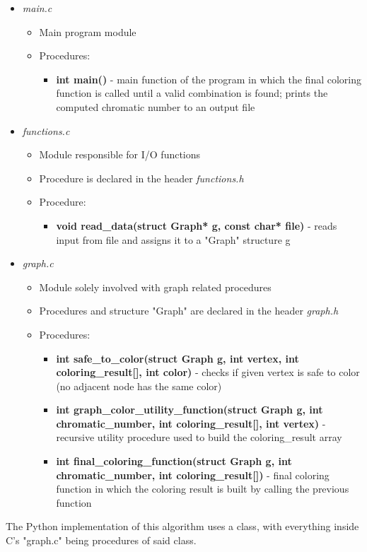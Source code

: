 \documentclass[12pt]{article}
\begin{document}
\begin{itemize}
\item \textit{main.c}
\begin{itemize}
\item Main program module
\item Procedures: \begin{itemize}\item \textbf{int main()} - main function of the program in which the final coloring function is called until a valid combination is found; prints the computed chromatic number to an output file\end{itemize}
\end{itemize}
\item \textit{functions.c}
\begin{itemize}
\item Module responsible for I/O functions
\item Procedure is declared in the header \textit{functions.h}
\item Procedure:
\begin{itemize}
\item \textbf{void read\_data(struct Graph* g, const char* file)} - reads input from file and assigns it to a "Graph" structure g
\end{itemize}
\end{itemize}
\item \textit{graph.c}
\begin{itemize}
\item Module solely involved with graph related procedures
\item Procedures and structure "Graph" are declared in the header \textit{graph.h}
\item Procedures:
\begin{itemize}
\setlength\itemsep{1em}
\item \textbf{int safe\_to\_color(struct Graph g, int vertex, int coloring\_result[], int color)} - checks if given vertex is safe to color (no adjacent node has the same color)
\item \textbf{int graph\_color\_utility\_function(struct Graph g, int chromatic\_number, int coloring\_result[], int vertex)} - recursive utility procedure used to build the coloring\_result array
\item \textbf{int final\_coloring\_function(struct Graph g, int chromatic\_number, int coloring\_result[])} - final coloring function in which the coloring result is built by calling the previous function
\end{itemize}
\end{itemize}
\end{itemize}
The Python implementation of this algorithm uses a class, with everything inside C's "graph.c" being procedures of said class.
\end{document}
